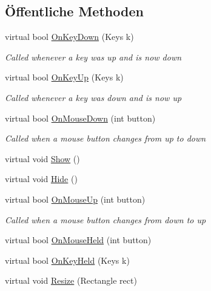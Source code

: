 \subsection*{Öffentliche Methoden}
\begin{DoxyCompactItemize}
\item 
virtual bool \hyperlink{class_gruppe22_1_1_client_1_1_u_i_element_a0f9957f48ecb697ff5ae1ac3f0873064}{On\-Key\-Down} (Keys k)
\begin{DoxyCompactList}\small\item\em Called whenever a key was up and is now down \end{DoxyCompactList}\item 
virtual bool \hyperlink{class_gruppe22_1_1_client_1_1_u_i_element_a555436883e05d5c2df8aff0d1b5230ab}{On\-Key\-Up} (Keys k)
\begin{DoxyCompactList}\small\item\em Called whenever a key was down and is now up \end{DoxyCompactList}\item 
virtual bool \hyperlink{class_gruppe22_1_1_client_1_1_u_i_element_a0530df2286336160b8b39c74ba380a44}{On\-Mouse\-Down} (int button)
\begin{DoxyCompactList}\small\item\em Called when a mouse button changes from up to down \end{DoxyCompactList}\item 
virtual void \hyperlink{class_gruppe22_1_1_client_1_1_u_i_element_a7d3595683a3f3e3a18788301e432204a}{Show} ()
\item 
virtual void \hyperlink{class_gruppe22_1_1_client_1_1_u_i_element_a0758d4427656b0109fc2ded57e83c0a9}{Hide} ()
\item 
virtual bool \hyperlink{class_gruppe22_1_1_client_1_1_u_i_element_a2765f580db64fba65696801389c6afab}{On\-Mouse\-Up} (int button)
\begin{DoxyCompactList}\small\item\em Called when a mouse button changes from down to up \end{DoxyCompactList}\item 
virtual bool \hyperlink{class_gruppe22_1_1_client_1_1_u_i_element_a054511c82ea1a27e503e00fd838974d2}{On\-Mouse\-Held} (int button)
\item 
virtual bool \hyperlink{class_gruppe22_1_1_client_1_1_u_i_element_a00a8a507f4701226bd2406ae501750d6}{On\-Key\-Held} (Keys k)
\item 
virtual void \hyperlink{class_gruppe22_1_1_client_1_1_u_i_element_a4050b9cf2755755858fc20359b5e60fa}{Resize} (Rectangle rect)

\end{DoxyCompactItemize}

